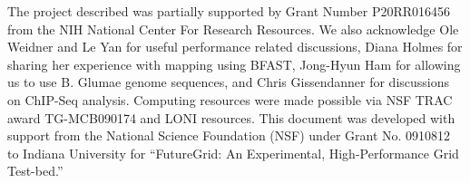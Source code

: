 \documentclass{cpeauth}
\begin{document}
The project described was partially supported by Grant Number
P20RR016456 from the NIH National Center For Research Resources.  We
also acknowledge Ole Weidner and Le Yan for useful performance related
discussions, Diana Holmes for sharing her experience with mapping
using BFAST, Jong-Hyun Ham for allowing us to use B. Glumae genome
sequences, and Chris Gissendanner for discussions on ChIP-Seq analysis.   Computing
resources were made possible via NSF TRAC award TG-MCB090174 and LONI
resources.  This document was developed with support from the National
Science Foundation (NSF) under Grant No.  0910812 to Indiana
University for ``FutureGrid: An Experimental, High-Performance Grid
Test-bed.''

% 
 

\end{document}
